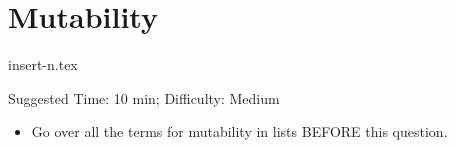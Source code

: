\documentclass{exam}
\begin{document}
\section{Mutability}
\begin{questions}
    {insert-n.tex}
    \begin{questionmeta}
        Suggested Time: 10 min; Difficulty: Medium
        \begin{itemize}
            \item    Go over all the terms for mutability in lists BEFORE this question. 
        \end{itemize}
      \end{questionmeta}    
\end{questions}
\end{document}
